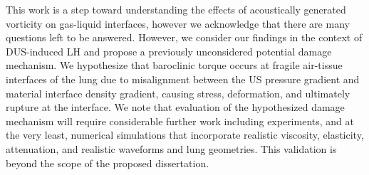 This work is a step toward understanding the effects of acoustically
generated vorticity on gas-liquid interfaces, however we acknowledge
that there are many questions left to be answered. However, we
consider our findings in the context of \ac{DUS}-induced \ac{LH} and
propose a previously unconsidered potential damage mechanism. We
hypothesize that baroclinic torque occurs at fragile air-tissue
interfaces of the lung due to misalignment between the \ac{US}
pressure gradient and material interface density gradient, causing
stress, deformation, and ultimately rupture at the interface. We note
that evaluation of the hypothesized damage mechanism will require
considerable further work including experiments, and at the very
least, numerical simulations that incorporate realistic viscosity,
elasticity, attenuation, and realistic waveforms and lung
geometries. This validation is beyond the scope of the proposed
dissertation.

